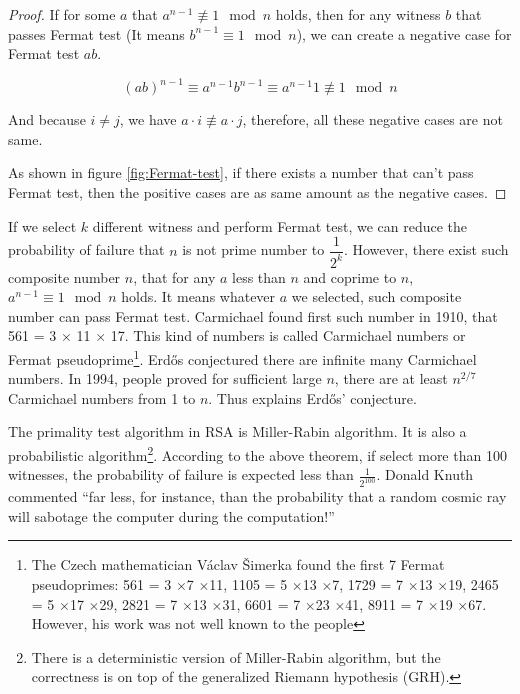 \documentclass{article}
\begin{document}
\begin{proof}
If for some $a$ that $a^{n-1} \not\equiv 1 \mod n$ holds, then for any witness $b$ that passes Fermat test (It means $b^{n-1} \equiv 1 \mod n$), we can create a negative case for Fermat test $ab$.

\[
(ab)^{n-1} \equiv a^{n-1}b^{n-1} \equiv a^{n-1}1 \not\equiv 1 \mod n
\]

And because $i \neq j$, we have $a \cdot i \not\equiv a \cdot j$, therefore, all these negative cases are not same.

As shown in figure \ref{fig:Fermat-test}, if there exists a number that can't pass Fermat test, then the positive cases are as same amount as the negative cases.
\end{proof}

If we select $k$ different witness and perform Fermat test, we can reduce the probability of failure that $n$ is not prime number to $\dfrac{1}{2^k}$. However, there exist such composite number $n$, that for any $a$ less than $n$ and coprime to $n$, $a^{n-1} \equiv 1 \mod n$ holds. It means whatever $a$ we selected, such composite number can pass Fermat test. Carmichael found first such number in 1910, that 561 = 3 $\times$ 11 $\times$ 17. This kind of numbers is called Carmichael numbers or Fermat pseudoprime\footnote{The Czech mathematician Václav Šimerka found the first 7 Fermat pseudoprimes: 561 = 3 $\times$7 $\times$11, 1105 = 5 $\times$13 $\times$7, 1729 = 7 $\times$13 $\times$19, 2465 = 5 $\times$17 $\times$29, 2821 = 7 $\times$13 $\times$31, 6601 = 7 $\times$23 $\times$41, 8911 = 7 $\times$19 $\times$67. However, his work was not well known to the people}. Erdős conjectured there are infinite many Carmichael numbers. In 1994, people proved for sufficient large $n$, there are at least $n^{2/7}$ Carmichael numbers from 1 to $n$. Thus explains Erdős' conjecture\cite{Wiki-Carmichael-number}.

The primality test algorithm in RSA is Miller-Rabin algorithm. It is also a probabilistic algorithm\footnote{There is a deterministic version of Miller-Rabin algorithm, but the correctness is on top of the generalized Riemann hypothesis (GRH)\cite{Wiki-Miller-Rabin}.}. According to the above theorem, if select more than 100 witnesses, the probability of failure is expected less than $\frac{1}{2^{100}}$. Donald Knuth commented ``far less, for instance, than the probability that a random cosmic ray will sabotage the computer during the computation!''

\end{document}
